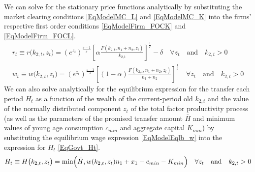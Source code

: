 \documentclass[letterpaper,12pt]{article}
\theoremstyle{definition}
\newcommand\ve{\varepsilon}
\begin{document}
    \begin{spacing}{1.5}

    We can solve for the stationary price functions analytically by substituting the market clearing conditions \eqref{EqModelMC_L} and \eqref{EqModelMC_K} into the firms' respective first order conditions \eqref{EqModelFirm_FOCK} and \eqref{EqModelFirm_FOCL}.
    \begin{gather}
      r_t\equiv r\bigl(k_{2,t}, z_t\bigr) = (e^{z_t})^\frac{\ve-1}{\ve}\left[\alpha\frac{F(k_{2,t},n_1+n_2,z_t)}{k_{2,t}}\right]^\frac{1}{\ve} - \delta \quad\forall z_t \quad\text{and}\quad k_{2,t}>0 \label{EqModelEqlb_r} \\
      w_t\equiv w\bigl(k_{2,t}, z_t\bigr) = (e^{z_t})^\frac{\ve-1}{\ve}\left[(1-\alpha)\frac{F(k_{2,t},n_1+n_2,z_t)}{n_1+n_2}\right]^\frac{1}{\ve} \quad\forall z_t \quad\text{and}\quad k_{2,t}>0 \label{EqModelEqlb_w}
    \end{gather}
    We can also solve analytically for the equilibrium expression for the transfer each period $H_t$ as a function of the wealth of the current-period old $k_{2,t}$ and the value of the normally distributed component $z_t$ of the total factor productivity process (as well as the parameters of the promised transfer amount $\bar{H}$ and minimum values of young age consumption $c_{min}$ and aggregate capital $K_{min}$)  by substituting the equilibrium wage expression \eqref{EqModelEqlb_w} into the expression for $H_t$ \eqref{EqGovt_Ht}.
    \begin{equation}\label{EqModelEqlb_H}
      H_t \equiv H\bigl(k_{2,t}, z_t\bigr) = \min\Bigl(\bar{H}, w(k_{2,t},z_t)n_1 + x_1 - c_{min} - K_{min}\Bigr) \quad\forall z_t \quad\text{and}\quad k_{2,t}>0
    \end{equation}


\end{spacing}
\end{document}
